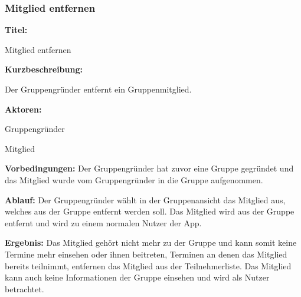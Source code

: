 \documentclass{scrartcl}
\begin{document}
	\subsubsection{Mitglied entfernen}
	\begin{description}
		\item \textbf{Titel:}
		\begin{description}
			\item Mitglied entfernen
		\end{description}
		\item \textbf{Kurzbeschreibung:}
		\begin{description}
			\item Der Gruppengründer entfernt ein Gruppenmitglied.
		\end{description}
		\item \textbf{Aktoren:}
		\begin{description}
			\item Gruppengründer
			\item Mitglied
		\end{description}
		\item \textbf{Vorbedingungen:} \newline	Der Gruppengründer hat zuvor eine Gruppe gegründet und das Mitglied wurde vom Gruppengründer in die Gruppe aufgenommen.
		\item \textbf{Ablauf:} \newline Der Gruppengründer wählt in der Gruppenansicht das Mitglied aus, welches aus der Gruppe entfernt werden soll. Das Mitglied wird aus der Gruppe entfernt und wird zu einem normalen Nutzer der App.
		\item \textbf{Ergebnis:} \newline Das Mitglied gehört nicht mehr zu der Gruppe und kann somit keine Termine mehr einsehen oder ihnen beitreten, Terminen an denen das Mitglied bereits teilnimmt, entfernen das Mitglied aus der Teilnehmerliste. Das Mitglied kann auch keine Informationen der Gruppe einsehen und wird als Nutzer betrachtet.
	\end{description}
	
	\newpage
	
\end{document}

